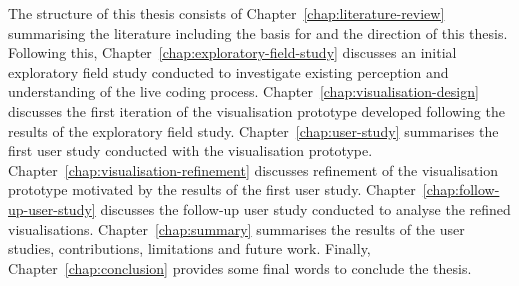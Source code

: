 The structure of this thesis consists of Chapter~\ref{chap:literature-review} summarising the literature including the basis for and the direction of this thesis. Following this, Chapter~\ref{chap:exploratory-field-study} discusses an initial exploratory field study conducted to investigate existing perception and understanding of the live coding process. Chapter~\ref{chap:visualisation-design} discusses the first iteration of the visualisation prototype developed following the results of the exploratory field study. Chapter~\ref{chap:user-study} summarises the first user study conducted with the visualisation prototype. Chapter~\ref{chap:visualisation-refinement} discusses refinement of the visualisation prototype motivated by the results of the first user study. Chapter~\ref{chap:follow-up-user-study} discusses the follow-up user study conducted to analyse the refined visualisations. Chapter~\ref{chap:summary} summarises the results of the user studies, contributions, limitations and future work. Finally, Chapter~\ref{chap:conclusion} provides some final words to conclude the thesis.







